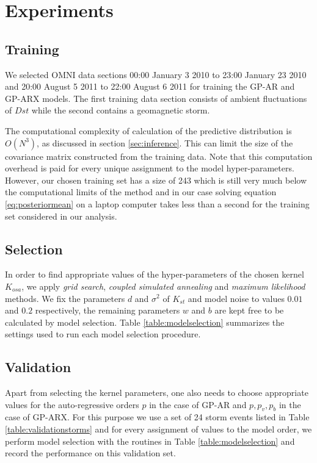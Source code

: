 \section{Experiments} \label{sec:modeltraining}

\subsection*{Training}

We selected OMNI data sections 00:00 January 3 2010 to 23:00 January 23 2010 and 20:00 August 5 2011 to 22:00 August 6 2011 for training the GP-AR and GP-ARX models. The first training data section consists of ambient fluctuations of $Dst$ while the second contains a geomagnetic storm.

The computational complexity of calculation of the predictive distribution is $O(N^3)$, as discussed in section \ref{sec:inference}. This can limit the size of the covariance matrix constructed from the training data. Note that this computation overhead is paid for every unique assignment to the model hyper-parameters. However, our chosen training set has a size of 243 which is still very much below the computational limits of the method and in our case solving equation \ref{eq:posteriormean} on a laptop computer takes less than a second for the training set considered in our analysis. 

\subsection*{Selection}

In order to find appropriate values of the hyper-parameters of the chosen kernel $K_{osa}$, we apply \emph{grid search}, \emph{coupled simulated annealing} and \emph{maximum likelihood} methods. We fix the parameters $d$ and $\sigma^2$ of $K_{st}$ and model noise to values $0.01$ and $0.2$ respectively, the remaining parameters $w$ and $b$ are kept free to be calculated by model selection. Table \ref{table:modelselection} summarizes the settings used to run each model selection procedure.

\subsection*{Validation}

Apart from selecting the kernel parameters, one also needs to choose appropriate values for the auto-regressive orders $p$ in the case of GP-AR and $p, p_v, p_b$ in the case of GP-ARX. For this purpose we use a set of 24 storm events listed in Table \ref{table:validationstorms} and for every assignment of values to the model order, we perform model selection with the routines in Table \ref{table:modelselection} and record the performance on this validation set.

